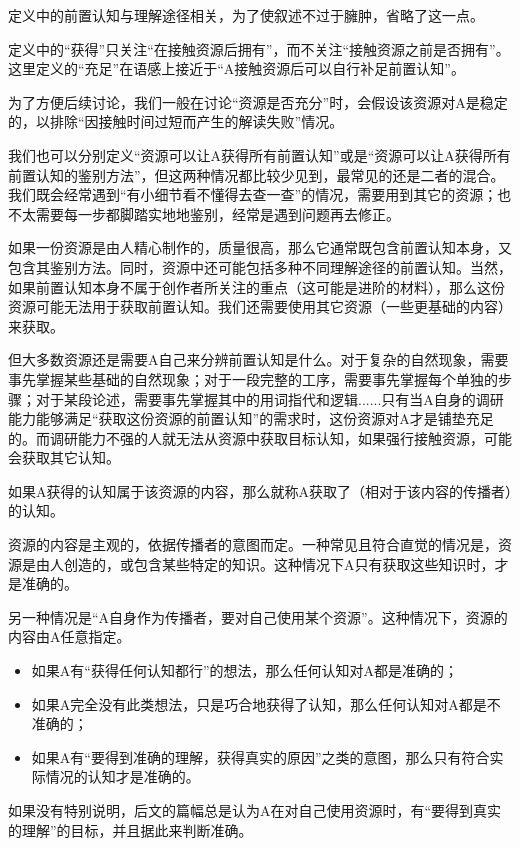 \begin{explain}
定义中的前置认知与理解途径相关，为了使叙述不过于臃肿，省略了这一点。

定义中的“获得”只关注“在接触资源后拥有”，而不关注“接触资源之前是否拥有”。这里定义的“充足”在语感上接近于“A接触资源后可以自行补足前置认知”。

为了方便后续讨论，我们一般在讨论“资源是否充分”时，会假设该资源对A是稳定的，以排除“因接触时间过短而产生的解读失败”情况。

我们也可以分别定义“资源可以让A获得所有前置认知”或是“资源可以让A获得所有前置认知的鉴别方法”，但这两种情况都比较少见到，最常见的还是二者的混合。我们既会经常遇到“有小细节看不懂得去查一查”的情况，需要用到其它的资源；也不太需要每一步都脚踏实地地鉴别，经常是遇到问题再去修正。

如果一份资源是由人精心制作的，质量很高，那么它通常既包含前置认知本身，又包含其鉴别方法。同时，资源中还可能包括多种不同理解途径的前置认知。当然，如果前置认知本身不属于创作者所关注的重点（这可能是进阶的材料），那么这份资源可能无法用于获取前置认知。我们还需要使用其它资源（一些更基础的内容）来获取。

但大多数资源还是需要A自己来分辨前置认知是什么。对于复杂的自然现象，需要事先掌握某些基础的自然现象；对于一段完整的工序，需要事先掌握每个单独的步骤；对于某段论述，需要事先掌握其中的用词指代和逻辑......只有当A自身的调研能力能够满足“获取这份资源的前置认知”的需求时，这份资源对A才是铺垫充足的。而调研能力不强的人就无法从资源中获取目标认知，如果强行接触资源，可能会获取其它认知。
\end{explain}
如果A获得的认知属于该资源的内容，那么就称A获取了（相对于该内容的传播者）的认知。
\begin{explain}
资源的内容是主观的，依据传播者的意图而定。一种常见且符合直觉的情况是，资源是由人创造的，或包含某些特定的知识。这种情况下A只有获取这些知识时，才是准确的。

另一种情况是“A自身作为传播者，要对自己使用某个资源”。这种情况下，资源的内容由A任意指定。
\begin{itemize}
\item 如果A有“获得任何认知都行”的想法，那么任何认知对A都是准确的；
\item 如果A完全没有此类想法，只是巧合地获得了认知，那么任何认知对A都是不准确的；
\item 如果A有“要得到准确的理解，获得真实的原因”之类的意图，那么只有符合实际情况的认知才是准确的。
\end{itemize}
如果没有特别说明，后文的篇幅总是认为A在对自己使用资源时，有“要得到真实的理解”的目标，并且据此来判断准确。
\end{explain}

